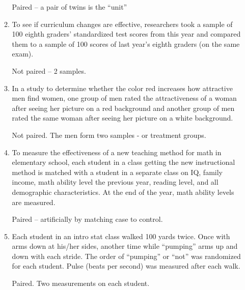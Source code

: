 \begin{enumerate}
\begin{enumerate}
\begin{key} Paired -- a pair of twins is the ``unit''
\end{key}


    \item To see if curriculum changes are effective, researchers took
      a sample of 100 eighth graders' standardized test scores from
      this year and compared them to a sample of 100 scores of last
      year's eighth graders (on the same exam).
\begin{students}
 \vspace{1cm}
\end{students}

\begin{key} Not paired -- 2 samples.
\end{key}


    \item In a study to determine whether the color red increases how
      attractive men find women, one group of men rated the
      attractiveness of a woman after seeing her picture on a red
      background and another group of men rated the same woman after
      seeing her picture on a white background.  
\begin{students}
 \vspace{1cm}
\end{students}

\begin{key} Not paired. The men form two samples - or treatment groups.
\end{key}


    \item To measure the effectiveness of a new teaching method for
      math in elementary school, each student in a class getting the
      new instructional method is matched with a student in a separate
      class on IQ, family income, math ability level the previous
      year, reading level, and all demographic characteristics.  At
      the end of the year, math ability levels are measured.
\begin{students}
 \vspace{1cm}
\end{students}

\begin{key} Paired -- artificially by matching case to control.
\end{key}
  

\item Each student in an intro stat class walked 100 yards twice. Once
  with arms down at his/her sides, another time while ``pumping'' arms
  up and down with each stride. The order of ``pumping'' or ``not''
  was randomized for each student.  Pulse (beats per second) was
  measured after each walk.
\begin{students}
 \vspace{1cm}
\end{students}

\begin{key} Paired. Two measurements on each student.
\end{key}


    \end{enumerate}
  \end{enumerate}
